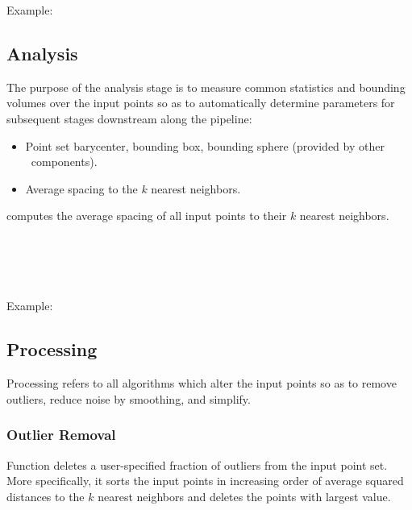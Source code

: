 Example:



\subsection{Analysis}

The purpose of the analysis stage is to measure common statistics and bounding volumes over the input points
so as to automatically determine parameters for subsequent stages downstream along the pipeline:
\begin{itemize}
  \item Point set barycenter, bounding box,
        bounding sphere (provided by other \cgal\ components).
  \item Average spacing to the $k$ nearest neighbors.
\end{itemize}

 computes the average spacing of all input points to their $k$ nearest neighbors.

  \\
  \\
  \\
  \\

Example:



\subsection{Processing}

Processing refers to all algorithms which alter the input points so as to remove outliers, reduce noise by smoothing, and simplify.

\subsubsection{Outlier Removal}

Function  deletes a user-specified fraction of outliers from the input point set.
More specifically, it sorts the input points in increasing order of average squared distances to the $k$ nearest neighbors
and deletes the points with largest value.

